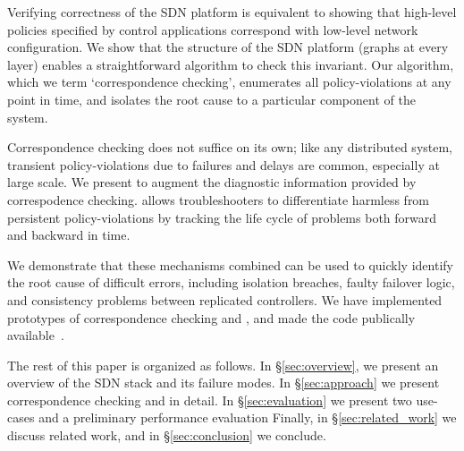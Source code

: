 Verifying correctness of the SDN platform is equivalent to showing that
high-level policies specified by control applications correspond with 
low-level network configuration. We show that the structure of the
SDN platform (graphs at every layer) enables a straightforward
algorithm to check this invariant. Our algorithm, which we term
`correspondence checking',
enumerates all policy-violations at any point in time, and isolates the
root cause to a particular component of the system.

Correspondence checking does not suffice on its own; like any distributed
system, transient policy-violations due to failures and delays are 
common, especially at large scale. We present \simulator{} to
augment the diagnostic information provided by correspodence checking.
\Simulator{} allows troubleshooters 
to differentiate harmless from persistent policy-violations by tracking the life cycle of problems 
both forward and backward in time.

We demonstrate that these mechanisms combined can be used to quickly
identify the root cause of difficult errors, including isolation breaches,
faulty failover logic, and consistency problems between replicated
controllers. We have implemented prototypes
of correspondence checking and \simulator{}, and made the code publically
available~\cite{github}.

The rest of this paper is organized as follows. In \S\ref{sec:overview},
we present an overview of the SDN stack and its failure modes.
In \S\ref{sec:approach} we present correspondence checking and
\simulator{} in detail. In \S\ref{sec:evaluation} we present
two use-cases and a preliminary performance evaluation
Finally, in \S\ref{sec:related_work} we discuss related work,
and in \S\ref{sec:conclusion} we conclude.
